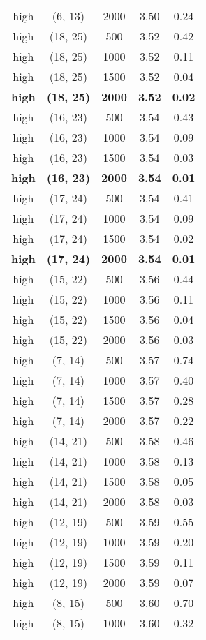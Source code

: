 \begin{tabular}{c c c c c}
high & (6, 13) &  2000 & 3.50 & 0.24 \\
high & (18, 25) &  500 & 3.52 & 0.42 \\
high & (18, 25) &  1000 & 3.52 & 0.11 \\
high & (18, 25) &  1500 & 3.52 & 0.04 \\
\textbf{high} & \textbf{(18, 25)} & \textbf{ 2000} & \textbf{3.52} & \textbf{0.02} \\
high & (16, 23) &  500 & 3.54 & 0.43 \\
high & (16, 23) &  1000 & 3.54 & 0.09 \\
high & (16, 23) &  1500 & 3.54 & 0.03 \\
\textbf{high} & \textbf{(16, 23)} & \textbf{ 2000} & \textbf{3.54} & \textbf{0.01} \\
high & (17, 24) &  500 & 3.54 & 0.41 \\
high & (17, 24) &  1000 & 3.54 & 0.09 \\
high & (17, 24) &  1500 & 3.54 & 0.02 \\
\textbf{high} & \textbf{(17, 24)} & \textbf{ 2000} & \textbf{3.54} & \textbf{0.01} \\
high & (15, 22) &  500 & 3.56 & 0.44 \\
high & (15, 22) &  1000 & 3.56 & 0.11 \\
high & (15, 22) &  1500 & 3.56 & 0.04 \\
high & (15, 22) &  2000 & 3.56 & 0.03 \\
high & (7, 14) &  500 & 3.57 & 0.74 \\
high & (7, 14) &  1000 & 3.57 & 0.40 \\
high & (7, 14) &  1500 & 3.57 & 0.28 \\
high & (7, 14) &  2000 & 3.57 & 0.22 \\
high & (14, 21) &  500 & 3.58 & 0.46 \\
high & (14, 21) &  1000 & 3.58 & 0.13 \\
high & (14, 21) &  1500 & 3.58 & 0.05 \\
high & (14, 21) &  2000 & 3.58 & 0.03 \\
high & (12, 19) &  500 & 3.59 & 0.55 \\
high & (12, 19) &  1000 & 3.59 & 0.20 \\
high & (12, 19) &  1500 & 3.59 & 0.11 \\
high & (12, 19) &  2000 & 3.59 & 0.07 \\
high & (8, 15) &  500 & 3.60 & 0.70 \\
high & (8, 15) &  1000 & 3.60 & 0.32 \\

\end{tabular}
